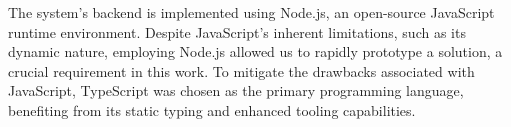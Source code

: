 The system's backend is implemented using Node.js, an open-source JavaScript
runtime environment. Despite JavaScript's inherent limitations, such as its
dynamic nature, employing Node.js allowed us to rapidly prototype a solution, a
crucial requirement in this work. To mitigate the drawbacks associated with
JavaScript, TypeScript was chosen as the primary programming language,
benefiting from its static typing and enhanced tooling capabilities.
